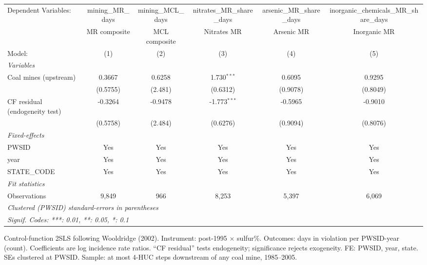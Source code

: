 
\begingroup
\centering
\begin{tabular}{lccccc}
   \tabularnewline \midrule \midrule
   Dependent Variables:           & mining\_MR\_days   & mining\_MCL\_days   & nitrates\_MR\_share\_days    & arsenic\_MR\_share\_days    & inorganic\_chemicals\_MR\_share\_days\\      
                                  & MR composite       & MCL composite       & Nitrates MR                  & Arsenic MR                  & Inorganic MR \\   
   Model:                         & (1)                & (2)                 & (3)                          & (4)                         & (5)\\  
   \midrule
   \emph{Variables}\\
   Coal mines (upstream)          & 0.3667             & 0.6258              & 1.730$^{***}$                & 0.6095                      & 0.9295\\   
                                  & (0.5755)           & (2.481)             & (0.6312)                     & (0.9078)                    & (0.8049)\\   
   CF residual (endogeneity test) & -0.3264            & -0.9478             & -1.773$^{***}$               & -0.5965                     & -0.9010\\   
                                  & (0.5758)           & (2.484)             & (0.6276)                     & (0.9094)                    & (0.8076)\\   
   \midrule
   \emph{Fixed-effects}\\
   PWSID                          & Yes                & Yes                 & Yes                          & Yes                         & Yes\\  
   year                           & Yes                & Yes                 & Yes                          & Yes                         & Yes\\  
   STATE\_CODE                    & Yes                & Yes                 & Yes                          & Yes                         & Yes\\  
   \midrule
   \emph{Fit statistics}\\
   Observations                   & 9,849              & 966                 & 8,253                        & 5,397                       & 6,069\\  
   \midrule \midrule
   \multicolumn{6}{l}{\emph{Clustered (PWSID) standard-errors in parentheses}}\\
   \multicolumn{6}{l}{\emph{Signif. Codes: ***: 0.01, **: 0.05, *: 0.1}}\\
\end{tabular}
 
\par \raggedright 
Control-function 2SLS following Wooldridge (2002). Instrument: post-1995 $\times$ sulfur\%. Outcomes: days in violation per PWSID-year (count). Coefficients are log incidence rate ratios. ``CF residual'' tests endogeneity; significance rejects exogeneity. FE: PWSID, year, state. SEs clustered at PWSID. Sample: at most 4-HUC steps downstream of any coal mine, 1985--2005.
\par\endgroup


